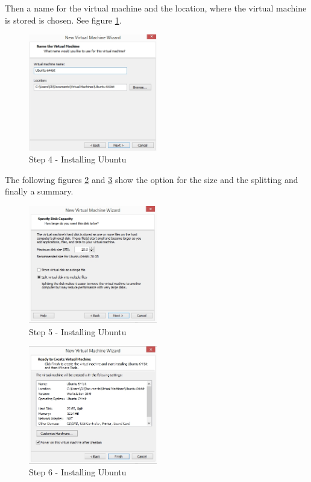 Then a name for the virtual machine and the location, where the virtual machine is stored is chosen. See figure \ref{fig:Ub4}.

\begin{figure}[H]
	\centering\includegraphics[width=0.5\textwidth]{fig/Ub4.jpg}
	\caption{Step 4 - Installing Ubuntu}
	\label{fig:Ub4}
\end{figure}

The following figures \ref{fig:Ub5} and \ref{fig:Ub6} show the option for the size and the splitting and finally a summary.

\begin{figure}[H]
	\centering\includegraphics[width=0.5\textwidth]{fig/Ub5.jpg}
	\caption{Step 5 - Installing Ubuntu}
	\label{fig:Ub5}
\end{figure}

\begin{figure}[H]
	\centering\includegraphics[width=0.5\textwidth]{fig/Ub6.jpg}
	\caption{Step 6 - Installing Ubuntu}
	\label{fig:Ub6}
\end{figure}

